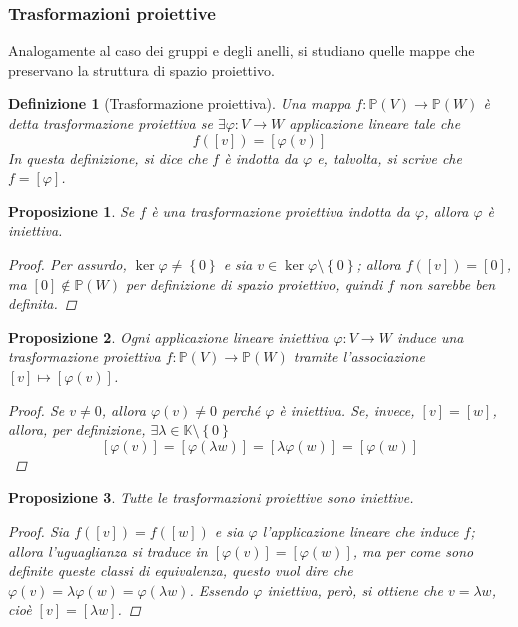\documentclass[11pt, a4paper]{scrartcl}
\theoremstyle{style1}
\newtheorem{prop}{Proposizione}[section]
\newtheorem{definizione}{Definizione}[section]
\numberwithin{equation}{subsection}
\begin{document}
\subsubsection{Trasformazioni proiettive}
Analogamente al caso dei gruppi e degli anelli, si studiano quelle mappe che preservano la struttura di spazio proiettivo.
\begin{definizione}
	[Trasformazione proiettiva]
	Una mappa $f : \mathbb{P}(V)\to \mathbb{P}(W)$ \`e detta \textit{trasformazione proiettiva} se $\exists \varphi : V \to W$ applicazione lineare tale che
	\[
		f([v]) = [\varphi (v)]
	\] 
	In questa definizione, si dice che $f$ \`e \textit{indotta} da $\varphi $ e, talvolta, si scrive che $f = [\varphi ]$.
\end{definizione}
\begin{prop}
	Se $f$ \`e una trasformazione proiettiva indotta da $\varphi $, allora $\varphi $ \`e iniettiva.
	\begin{proof}
		Per assurdo, $\operatorname{ker} \varphi  \neq \left\{ 0 \right\} $ e sia $v \in \operatorname{ker} \varphi \setminus \left\{ 0 \right\} $; allora $f([v]) = [0]$, ma $[0] \not \in \mathbb{P}(W)$ per definizione di spazio proiettivo, quindi $f$ non sarebbe ben definita.
	\end{proof}
\end{prop}
\begin{prop}
	Ogni applicazione lineare iniettiva $\varphi :V\to W$ induce una trasformazione proiettiva $f: \mathbb{P}(V) \to \mathbb{P}(W)$ tramite l'associazione $[v] \mapsto [\varphi (v)]$.
	\begin{proof}
		Se $v\neq 0$, allora $\varphi (v) \neq 0$ perch\'e $\varphi $ \`e iniettiva. 
		Se, invece, $[v] = [w]$, allora, per definizione, $\exists \lambda  \in \mathbb{K}\setminus \left\{ 0 \right\}$
		\[
			[\varphi (v) ] = [\varphi (\lambda w)] = [\lambda \varphi (w)] = [\varphi (w)]
		\] 
		
	\end{proof}
\end{prop}
\begin{prop}
	Tutte le trasformazioni proiettive sono iniettive.
	\begin{proof}
		Sia $f([v]) = f([w])$ e sia $\varphi $ l'applicazione lineare che induce $f$; allora l'uguaglianza si traduce in $[\varphi (v)]=[\varphi (w)]$, ma per come sono definite queste classi di equivalenza, questo vuol dire che $\varphi (v) = \lambda \varphi (w) = \varphi (\lambda w)$.
		Essendo $\varphi $ iniettiva, per\`o, si ottiene che $v = \lambda w$, cio\`e $[v] = [\lambda w]$.
		
	\end{proof}
\end{prop}
\end{document}
